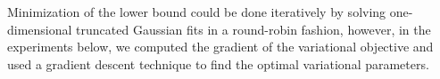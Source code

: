 \documentclass{article} %
\newcommand{\Holder}{H\"older\xspace}
\newcommand{\dataset}{\mathcal{D}}
\newcommand{\diag}[1]{\mathop{\textrm{diag}}\left(#1\right)}
\newcommand{\normdist}{\mathcal{N}}
\newcommand{\s}{s}
\def\Indic#1{\mathbb{I}_{\{#1\}}}
\def\w{\mathbf{w}}
\def\u{\mathbf{u}}
\def\s{\mathbf{s}}
\def\v{\mathbf{v}}
\def\X{X}
\def\Z{Z}
\def\y{\mathbf{y}}
\def\eye{\mathbf{I}}
\def\bzeros{\mathbf{0}}
\def\proba{p}
\renewcommand{\Re}{\mathbb{R}}
\begin{document}
Minimization of the lower bound could be done iteratively by solving one-dimensional truncated Gaussian fits in a round-robin 
fashion, however, in the experiments below, we computed the gradient of the variational objective and used a 
gradient descent technique to find the optimal variational parameters. 


%
\end{document}
